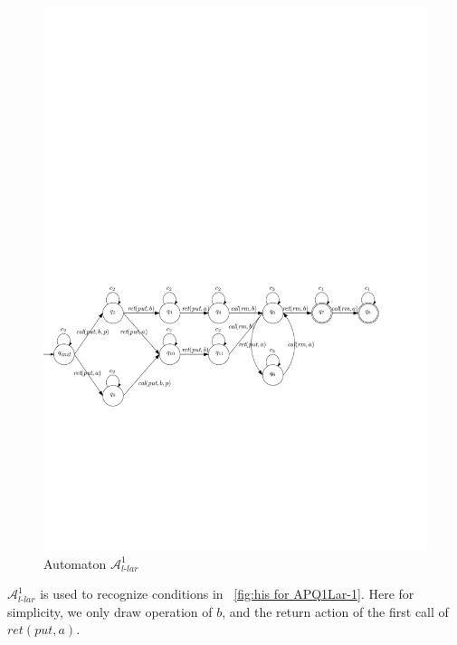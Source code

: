 \begin{figure}[htbp]
  \centering
  \includegraphics[width=1 \textwidth]{figures/PIC_AUTO_PQ1Lar-pprr.pdf}
  \caption{Automaton $\mathcal{A}_{\textit{l-lar}}^1$}
  \label{fig:automata APQ1Lar-1}
\end{figure}

$\mathcal{A}_{\textit{l-lar}}^1$ is used to recognize conditions in \figurename~\ref{fig:his for APQ1Lar-1}. Here for simplicity, we only draw operation of $b$, and the return action of the first call of $\textit{ret}(\textit{put},a)$.


